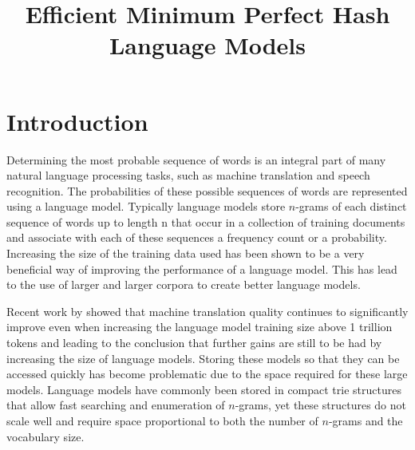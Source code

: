 \documentclass[10pt, a4paper]{article}
\title{Efficient Minimum Perfect Hash Language Models}
\begin{document}
\maketitleabstract

\section{Introduction}
Determining the most probable sequence of words is an integral part of many natural language processing tasks, such as machine translation and speech recognition.  The probabilities of these possible sequences of words are represented using a language model.  Typically language models store $n$-grams of each distinct sequence of words up to length n that occur in a collection of training documents and associate with each of these sequences a frequency count or a probability.  Increasing the size of the training data used has been shown to be a very beneficial way of improving the performance of a language model.  This has lead to the use of larger and larger corpora to create better language models. 

Recent work by  showed that machine translation quality continues to significantly improve even when increasing the language model training size above 1 trillion tokens and leading to the conclusion that further gains are still to be had by increasing the size of language models.  Storing these models so that they can be accessed quickly has become problematic due to the space required for these large models.   Language models have commonly been stored in compact trie structures that allow fast searching and enumeration of $n$-grams, yet these structures do not scale well and require space proportional to both the number of $n$-grams and the vocabulary size.
\end{document}
